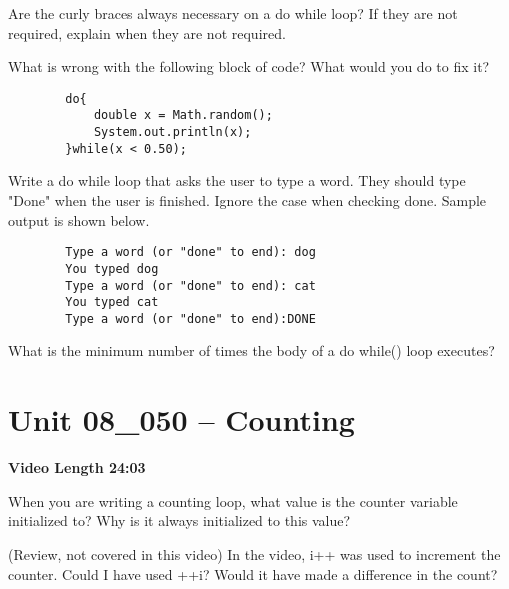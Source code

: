 \documentclass[letterpaper,12pt]{exam}
\newcommand{\unit}{Unit 08}
\begin{document}
\begin{questions}
\begin{samepage}
    \question Are the curly braces always necessary on a do while loop?  If they are not required, explain when they are not required.
    \vspace{5mm}
\end{samepage}


\begin{samepage}
    \question What is wrong with the following block of code?  What would you do to fix it?
    \begin{verbatim}
        do{
            double x = Math.random();
            System.out.println(x);
        }while(x < 0.50);
    \end{verbatim}
    \vspace{5mm}
\end{samepage}
\begin{samepage}
    \question Write a do while loop that asks the user to type a word.  They should type "Done" when the user is finished.  Ignore the case when checking done.  Sample output is shown below.
    \begin{verbatim}
        Type a word (or "done" to end): dog 
        You typed dog
        Type a word (or "done" to end): cat 
        You typed cat
        Type a word (or "done" to end):DONE 
    \end{verbatim}     
       \vspace{15mm}
\end{samepage}

\begin{samepage}
    \question What is the minimum number of times the body of a do{} while() loop executes?
    \vspace{5mm}
\end{samepage}



\section*{\unit\_050 -- Counting} %
\par{\selectfont\textbf{Video Length 24:03}}

\begin{samepage}
    \question When you are writing a counting loop, what value is the counter variable initialized to?  Why is it always initialized to this value?
    \vspace{5mm}
\end{samepage}
\begin{samepage}
    \question (Review, not covered in this video)  In the video, i++ was used to increment the counter.  Could I have used ++i?  Would it have made a difference in the count?
    \vspace{5mm}
\end{samepage}


\end{questions}
\end{document}
